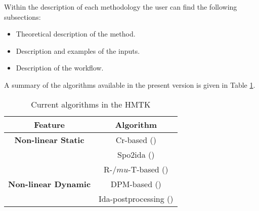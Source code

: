 Within the description of each methodology the user can find the following subsections:
\begin{itemize}
\item Theoretical description of the method.
\item Description and examples of the inputs.
\item Description of the workflow.
\end{itemize}

A summary of the algorithms available in the present version is given in Table \ref{tab:current_features}.
\begin{table}[!htbp]
\centering
\begin{tabular}{|c|c|} \hline
Feature & Algorithm\\ \hline
\textbf{Non-linear Static} & Cr-based (\cite{Ruiz-Garcia and Miranda, 2007})\\
    & Spo2ida (\cite{Vamvatsikos and Cornell, 2006}) \\
    & R-$/mu$-T-based (\cite{Dolsek and Fajfar, 2004}) \\ \hline
 \textbf{Non-linear Dynamic} & DPM-based (\cite{Silva et al., 2013})\\
  & Ida-postprocessing (\cite{Vamvatsikos and Cornell, 2002}) \\ \hline
\end{tabular}
\caption{Current algorithms in the HMTK}
\label{tab:current_features}
\end{table}

